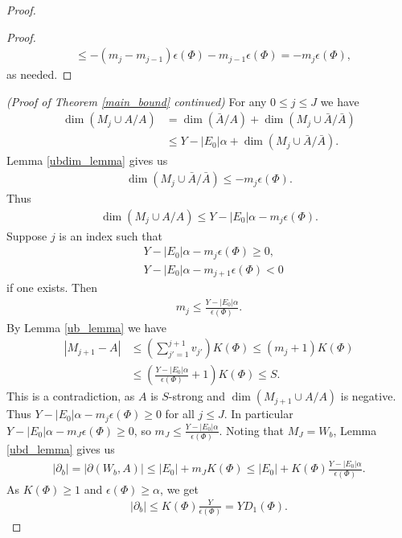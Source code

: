 \documentclass{amsart}
\newcommand{\BA}{\bar A}
\newcommand{\ppp}{\partial}
\newcommand{\paren}[1]{\left(#1\right)}
\newcommand{\abs}[1]{\left|#1\right|}
\begin{document}
\begin{proof}
\begin{proof}
\begin{align*}
      &\leq  -(m_j - m_{j-1})\epsilon(\Phi) - m_{j-1}  \epsilon(\Phi) =  - m_j  \epsilon(\Phi),
    \end{align*}
    as needed.
  \end{proof}
  \textit{(Proof of Theorem \ref{main_bound} continued)}
  For any $0 \leq j \leq J$ we have
  \begin{align*}
    \dim(M_j \cup A / A) &= \dim(\BA / A) + \dim(M_j \cup \BA / \BA) \\
    &\leq Y - |E_0|\alpha + \dim(M_j \cup \BA / \BA).
  \end{align*}
  Lemma \ref{ubdim_lemma} gives us
  \begin{align*}
    \dim(M_j \cup \BA / \BA) \leq -m_j  \epsilon(\Phi).
  \end{align*}
  Thus
  \begin{align*}
    \dim(M_j \cup A / A) \leq Y - |E_0| \alpha - m_j  \epsilon(\Phi).
  \end{align*}
  Suppose $j$ is an index such that
  \begin{align*}
    &Y - |E_0| \alpha - m_j  \epsilon(\Phi) \geq 0, \\
    &Y - |E_0| \alpha - m_{j+1}  \epsilon(\Phi) < 0
  \end{align*}
  if one exists.
  Then 
  \begin{align*}
    m_j \leq \frac{Y - |E_0| \alpha}{\epsilon(\Phi)}.
  \end{align*}
  By Lemma \ref{ub_lemma} we have
  \begin{align*}
    \abs{M_{j+1} - A} &\leq \paren{\sum_{j'=1}^{j+1} v_{j'}} K(\Phi) \leq (m_j + 1) K(\Phi) \\
                     &\leq \paren{\frac{Y - |E_0| \alpha}{\epsilon(\Phi)} + 1} K(\Phi) \leq S.
  \end{align*}
  This is a contradiction, as $A$ is $S$-strong and $\dim(M_{j+1} \cup A / A)$ is negative.
  Thus $Y - |E_0| \alpha - m_j  \epsilon(\Phi) \geq 0$ for all $j \leq J$.
  In particular $Y - |E_0| \alpha - m_J  \epsilon(\Phi) \geq 0$, so $m_J \leq \frac{Y - |E_0| \alpha}{\epsilon(\Phi)}$.
  Noting that $M_J = W_b$, Lemma \ref{ubd_lemma} gives us 
  \begin{align*}
      |\ppp_b| = |\partial(W_b, A)| \leq |E_0| + m_J  K(\Phi) \leq |E_0| + K(\Phi) \frac{Y - |E_0| \alpha}{\epsilon(\Phi)}.
  \end{align*}
  As $K(\Phi) \geq 1$ and $\epsilon(\Phi) \geq \alpha$, we get
  \begin{align*}
      |\ppp_b| \leq K(\Phi) \frac{Y}{\epsilon(\Phi)} = Y D_1(\Phi).

\end{align*}
\end{proof}
\end{document}

